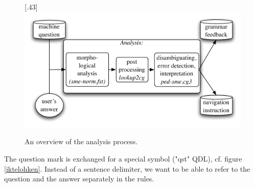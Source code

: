 \documentclass[11pt]{article}
\begin{document}
\begin{figure}[tbp]
\begin{center}
\scalebox{.48}[.43]{\includegraphics{presentation/img/qa2.pdf}}
\caption{An overview of the analysis process.}
\label{qasystem}
\end{center}
\end{figure}

The question mark is exchanged for a special symbol ("qst" QDL), cf. figure \ref{iktelohken}. Instead of a sentence delimiter, we want to be able to refer to the question and the answer separately in the rules.
\end{document}
